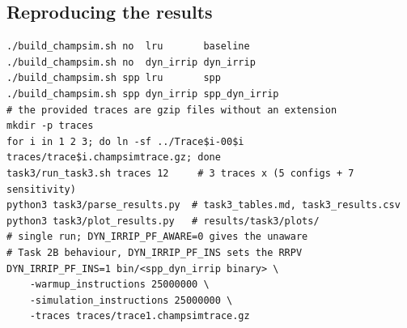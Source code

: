\documentclass[11pt]{article}
\begin{document}
\subsection{Reproducing the results}
\begin{verbatim}
./build_champsim.sh no  lru       baseline
./build_champsim.sh no  dyn_irrip dyn_irrip
./build_champsim.sh spp lru       spp
./build_champsim.sh spp dyn_irrip spp_dyn_irrip
# the provided traces are gzip files without an extension
mkdir -p traces
for i in 1 2 3; do ln -sf ../Trace$i-00$i traces/trace$i.champsimtrace.gz; done
task3/run_task3.sh traces 12     # 3 traces x (5 configs + 7 sensitivity)
python3 task3/parse_results.py  # task3_tables.md, task3_results.csv
python3 task3/plot_results.py   # results/task3/plots/
# single run; DYN_IRRIP_PF_AWARE=0 gives the unaware
# Task 2B behaviour, DYN_IRRIP_PF_INS sets the RRPV
DYN_IRRIP_PF_INS=1 bin/<spp_dyn_irrip binary> \
    -warmup_instructions 25000000 \
    -simulation_instructions 25000000 \
    -traces traces/trace1.champsimtrace.gz
\end{verbatim}
\end{document}
